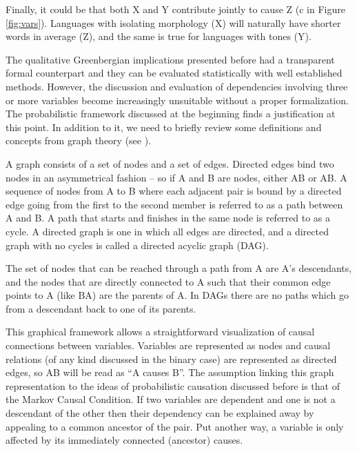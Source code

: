 \documentclass[output=paper]{langsci/langscibook}
\begin{document}
 Finally, it could be that both X and Y contribute jointly to cause Z (c in Figure \ref{fig:vars}). Languages with isolating morphology (X) will naturally have shorter words in average (Z), and the same is true for languages with tones (Y).
 
 The qualitative Greenbergian implications presented before had a transparent formal counterpart and they can be evaluated statistically with well established methods. However, the discussion and evaluation of dependencies involving three or more variables become increasingly unsuitable without a proper formalization. The probabilistic framework discussed at the beginning finds a justification at this point. In addition to it, we need to briefly review some definitions and concepts from graph theory (see \citealt{pearl2009causality}). 
 
A graph consists of a set of nodes and a set of edges. Directed edges bind two nodes in an asymmetrical fashion -- so if A and B are nodes, either A\textrightarrow B or A\textleftarrow B. A sequence of nodes from A to B where each adjacent pair is bound by a directed edge going from the first to the second member is referred to as a path between A and B. A path that starts and finishes in the same node is referred to as a cycle.  A directed graph is one in which all edges are directed, and a directed graph with no cycles is called a directed acyclic graph (DAG).

The set of nodes that can be reached through a path from A are A's descendants, and the nodes that are directly connected to A such that their common edge points to A (like B\textrightarrow A) are the parents of A.  In DAGs there are no paths which go from a descendant back to one of its parents. 
 
This graphical framework allows a straightforward visualization of causal connections between variables.  Variables are represented as nodes and causal relations (of any kind discussed in the binary case) are represented as directed edges, so A\textrightarrow B will be read as ``A causes B''. The assumption linking this graph representation to the ideas of probabilistic causation discussed before is that of the Markov Causal Condition.  If two variables are dependent and one is not a descendant of the other then their dependency can be explained away by appealing to a common ancestor of the pair.  Put another way, a variable is only affected by its immediately connected (ancestor) causes.
 
\end{document}
